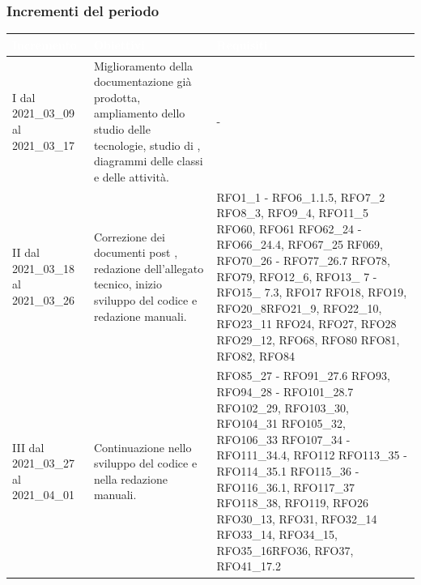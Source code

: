 \subsubsection{Incrementi del periodo}\label{IncrementiPDettaglio}
\begin{table}[H]
	\begin{center}
		\begin{tabular}{ |C{3cm} C{6cm} C{7cm}| }
			\textcolor{white}{\textbf{Incremento}} & \textcolor{white}{\textbf{Obiettivi}} & \textcolor{white}{\textbf{Requisiti}} \\ \hline
			I dal 2021\_03\_09 al 2021\_03\_17& Miglioramento della documentazione già prodotta, ampliamento dello studio delle tecnologie, studio di , diagrammi delle classi e delle attività.  & - \\ \hline
			II dal 2021\_03\_18 al 2021\_03\_26 	& Correzione dei documenti post , redazione dell'allegato tecnico, inizio sviluppo del codice e redazione manuali. &  
			RFO1\_1 - RFO6\_1.1.5, RFO7\_2 \newline
			RFO8\_3, RFO9\_4, RFO11\_5 \newline
			RFO60, RFO61 \newline
			RFO62\_24 - RFO66\_24.4, RFO67\_25 \newline
			RF069, RFO70\_26 - RFO77\_26.7 \newline
			RFO78, RFO79, RFO12\_6, \newline 
			RFO13\_ 7 - RFO15\_ 7.3, RFO17 \newline RFO18, RFO19, RFO20\_8\newline RFO21\_9, RFO22\_10, RFO23\_11 \newline RFO24, RFO27, RFO28 \newline RFO29\_12, RFO68, RFO80 \newline RFO81, RFO82, RFO84 \\ \hline
			III dal 2021\_03\_27 al 2021\_04\_01 	& Continuazione nello sviluppo del codice e nella redazione manuali. & RFO85\_27 - RFO91\_27.6 \newline
			RFO93, RFO94\_28 - RFO101\_28.7 \newline
			RFO102\_29, RFO103\_30, RFO104\_31 \newline
			RFO105\_32, RFO106\_33 \newline
			RFO107\_34 - RFO111\_34.4, RFO112 \newline
			RFO113\_35 - RFO114\_35.1\newline
			RFO115\_36 - RFO116\_36.1, RFO117\_37 \newline RFO118\_38, RFO119, RFO26 \newline RFO30\_13, RFO31, RFO32\_14 \newline RFO33\_14, RFO34\_15, RFO35\_16\newline  RFO36, RFO37, RFO41\_17.2 \\ \hline

\end{tabular}
\end{center}
\end{table}
